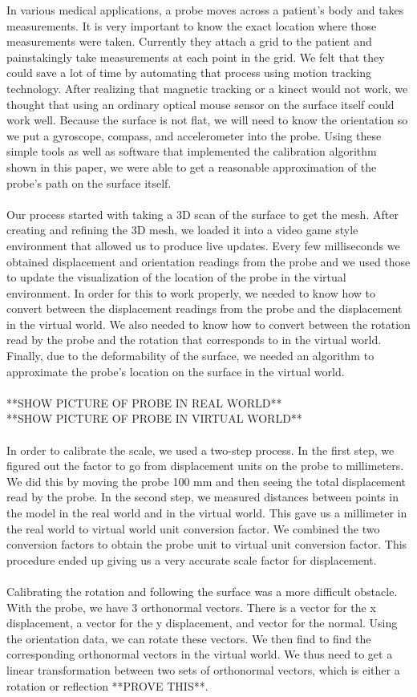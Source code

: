 \documentclass[11pt,psfig]{article}
\begin{document}
In various medical applications, a probe moves across a patient's body and takes measurements. It is very important to know the exact location where those measurements were taken. Currently they attach a grid to the patient and painstakingly take measurements at each point in the grid. We felt that they could save a lot of time by automating that process using motion tracking technology. After realizing that magnetic tracking or a kinect would not work, we thought that using an ordinary optical mouse sensor on the surface itself could work well. Because the surface is not flat, we will need to know the orientation so we put a gyroscope, compass, and accelerometer into the probe. Using these simple tools as well as software that implemented the calibration algorithm shown in this paper, we were able to get a reasonable approximation of the probe's path on the surface itself.\\
\\
Our process started with taking a 3D scan of the surface to get the mesh. After creating and refining the 3D mesh, we loaded it into a video game style environment that allowed us to produce live updates. Every few milliseconds we obtained displacement and orientation readings from the probe and we used those to update the visualization of the location of the probe in the virtual environment. In order for this to work properly, we needed to know how to convert between the displacement readings from the probe and the displacement in the virtual world. We also needed to know how to convert between the rotation read by the probe and the rotation that corresponds to in the virtual world. Finally, due to the deformability of the surface, we needed an algorithm to approximate the probe's location on the surface in the virtual world.\\
\\
**SHOW PICTURE OF PROBE IN REAL WORLD**\\
**SHOW PICTURE OF PROBE IN VIRTUAL WORLD**\\
\\
In order to calibrate the scale, we used a two-step process. In the first step, we figured out the factor to go from displacement units on the probe to millimeters. We did this by moving the probe 100 mm and then seeing the total displacement read by the probe. In the second step, we measured distances between points in the model in the real world and in the virtual world. This gave us a millimeter in the real world to virtual world unit conversion factor. We combined the two conversion factors to obtain the probe unit to virtual unit conversion factor. This procedure ended up giving us a very accurate scale factor for displacement. \\
\\
Calibrating the rotation and following the surface was a more difficult obstacle. With the probe, we have 3 orthonormal vectors. There is a vector for the x displacement, a vector for the y displacement, and vector for the normal. Using the orientation data, we can rotate these vectors. We then find to find the corresponding orthonormal vectors in the virtual world. We thus need to get a linear transformation between two sets of orthonormal vectors, which is either a rotation or reflection **PROVE THIS**.
\end{document}
